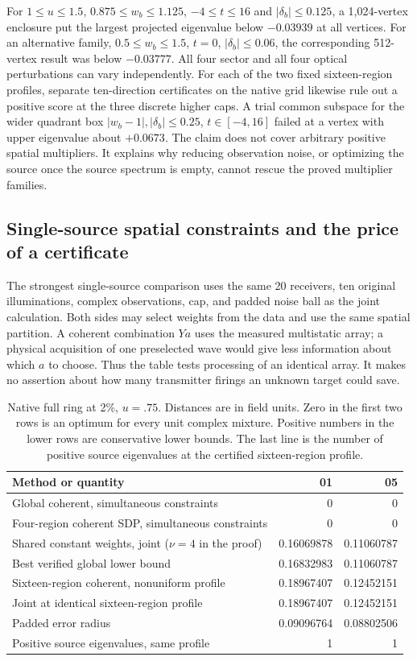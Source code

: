 \documentclass[anonymous,12pt]{iopjournal}
\theoremstyle{remark}\newtheorem{remark}[theorem]{Remark}
\numberwithin{equation}{section}
\begin{document}
For $1\le u\le1.5$, $0.875\le w_b\le1.125$, $-4\le t\le16$ and $|\delta_b|\le0.125$, a 1,024-vertex enclosure put the largest projected eigenvalue below $-0.03939$ at all vertices. For an alternative family, $0.5\le w_b\le1.5$, $t=0$, $|\delta_b|\le0.06$, the corresponding 512-vertex result was below $-0.03777$. All four sector and all four optical perturbations can vary independently. For each of the two fixed sixteen-region profiles, separate ten-direction certificates on the native grid likewise rule out a positive score at the three discrete higher caps. A trial common subspace for the wider quadrant box $|w_b-1|,|\delta_b|\le0.25$, $t\in[-4,16]$ failed at a vertex with upper eigenvalue about $+0.0673$. The claim does not cover arbitrary positive spatial multipliers. It explains why reducing observation noise, or optimizing the source once the source spectrum is empty, cannot rescue the proved multiplier families.

\subsection{Single-source spatial constraints and the price of a certificate}
The strongest single-source comparison uses the same 20 receivers, ten original illuminations, complex observations, cap, and padded noise ball as the joint calculation. Both sides may select weights from the data and use the same spatial partition. A coherent combination $Ya$ uses the measured multistatic array; a physical acquisition of one preselected wave would give less information about which $a$ to choose. Thus the table tests processing of an identical array. It makes no assertion about how many transmitter firings an unknown target could save.

\begin{table}[tb]
\caption{Native full ring at 2\%, $u=.75$. Distances are in field units. Zero in the first two rows is an optimum for every unit complex mixture. Positive numbers in the lower rows are conservative lower bounds. The last line is the number of positive source eigenvalues at the certified sixteen-region profile.}\label{tab:compare}
\centering\begin{tabular}{@{}>{\raggedright\arraybackslash}p{.49\linewidth}rr@{}}\toprule
Method or quantity & 01 & 05\\ \midrule
Global coherent, simultaneous constraints &0&0\\
Four-region coherent SDP, simultaneous constraints &0&0\\
Shared constant weights, joint ($\nu=4$ in the proof) &0.16069878&0.11060787\\
Best verified global lower bound &0.16832983&0.11060787\\
Sixteen-region coherent, nonuniform profile &0.18967407&0.12452151\\
Joint at identical sixteen-region profile &0.18967407&0.12452151\\
Padded error radius &0.09096764&0.08802506\\
Positive source eigenvalues, same profile &1&1\\ \bottomrule
\end{tabular}
\end{table}
\end{document}
